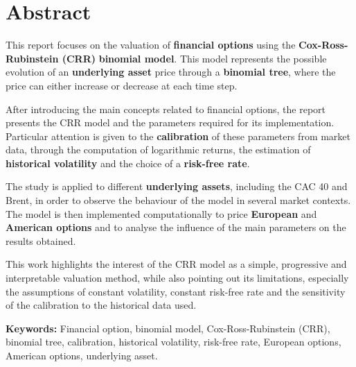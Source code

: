 \documentclass[11pt]{report}
\begin{document}

\chapter*{Abstract}

This report focuses on the valuation of \textbf{financial options} using the \textbf{Cox-Ross-Rubinstein (CRR)} \textbf{binomial model}. This model represents the possible evolution of an \textbf{underlying asset} price through a \textbf{binomial tree}, where the price can either increase or decrease at each time step.

After introducing the main concepts related to financial options, the report presents the CRR model and the parameters required for its implementation. Particular attention is given to the \textbf{calibration} of these parameters from market data, through the computation of logarithmic returns, the estimation of \textbf{historical volatility} and the choice of a \textbf{risk-free rate}.

The study is applied to different \textbf{underlying assets}, including the CAC 40 and Brent, in order to observe the behaviour of the model in several market contexts. The model is then implemented computationally to price \textbf{European} and \textbf{American options} and to analyse the influence of the main parameters on the results obtained.

This work highlights the interest of the CRR model as a simple, progressive and interpretable valuation method, while also pointing out its limitations, especially the assumptions of constant volatility, constant risk-free rate and the sensitivity of the calibration to the historical data used.

\vspace{1em}

\textbf{Keywords:} Financial option, binomial model, Cox-Ross-Rubinstein (CRR), binomial tree, calibration, historical volatility, risk-free rate, European options, American options, underlying asset.

\newpage



\renewcommand{\contentsname}{Table des matières}
\setlength{\cftbeforechapskip}{0.5em}
\tableofcontents
\end{document}

